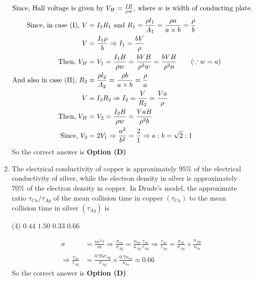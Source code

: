 \begin{enumerate}
\begin{tasks}
\end{tasks}
\begin{answer}
\begin{align*}
\intertext{Since, Hall voltage is given by $V_{H}=\frac{I B}{\rho w}$, where $w$ is width of conducting plate.}
\text{Since, in case (I), }V&=I_{1} R_{1}\text{ and }R_{1}=\frac{\rho l_{1}}{A_{1}}=\frac{\rho a}{a \times b}=\frac{\rho}{b}\\
V&=\frac{I_{1} \rho}{b} \Rightarrow I_{1}=\frac{b V}{\rho}\\
\text{Then, }V_{H}&=V_{1}=\frac{I_{1} B}{\rho w}=\frac{b V B}{\rho^{2} w}=\frac{b V B}{\rho^{2} a}
\qquad(\because w=a)\\
\text{And also in case (II), }R_{2}&=\frac{\rho l_{2}}{A_{2}}=\frac{\rho b}{a \times b}=\frac{\rho}{a}\\
V&=I_{2} R_{2} \Rightarrow I_{2}=\frac{V}{R_{2}}=\frac{V a}{\rho}\\
\text{Then, }V_{H}&=V_{2}=\frac{I_{2} B}{\rho w}=\frac{V a B}{\rho^{2} b}\\
\text{Since, }V_{2}&=2 V_{1} \Rightarrow \frac{a^{2}}{b^{2}}=\frac{2}{1} \Rightarrow a: b=\sqrt{2}: 1
\end{align*}
So the correct answer is \textbf{Option (D)}
\end{answer}
	\item The electrical conductivity of copper is approximately $95 \%$ of the electrical conductivity of silver, while the electron density in silver is approximately $70 \%$ of the electron density in copper. In Drude's model, the approximate ratio $\tau_{C u} / \tau_{A g}$ of the mean collision time in copper $\left(\tau_{C u}\right)$ to the mean collision time in silver $\left(\tau_{A g}\right)$ is
	{}
\begin{tasks}(4)
\task[\textbf{A.}] $0.44$
\task[\textbf{B.}]  $1.50$
\task[\textbf{C.}] $0.33$
\task[\textbf{D.}]  $0.66$
\end{tasks}
\begin{answer}
\begin{align*}
\sigma&=\frac{n e^{2} \tau}{m} \Rightarrow \frac{\sigma_{c u}}{\sigma_{A g}}=\frac{n_{c u}}{n_{A g}} \frac{\tau_{c u}}{\tau_{A g}} \Rightarrow \frac{\tau_{c u}}{\tau_{A g}}=\frac{\sigma_{c u}}{\sigma_{A g}} \times \frac{n_{A g}}{n_{c u}}\\
\Rightarrow \frac{\tau_{c u}}{\tau_{A g}}&=\frac{0.95 \sigma_{A g}}{\sigma_{A g}} \times \frac{0.7 n_{c u}}{n_{c u}} \approx 0.66
\end{align*}
So the correct answer is \textbf{Option (D)}

\end{answer}
\end{enumerate}
